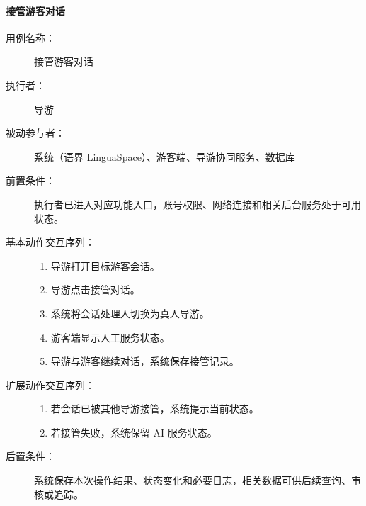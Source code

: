 \paragraph{接管游客对话}
\begin{description}
  \item[用例名称：] 接管游客对话
  \item[执行者：] 导游
  \item[被动参与者：] 系统（语界 LinguaSpace）、游客端、导游协同服务、数据库
  \item[前置条件：] 执行者已进入对应功能入口，账号权限、网络连接和相关后台服务处于可用状态。
  \item[基本动作交互序列：]
  \begin{enumerate}
    \item 导游打开目标游客会话。
    \item 导游点击接管对话。
    \item 系统将会话处理人切换为真人导游。
    \item 游客端显示人工服务状态。
    \item 导游与游客继续对话，系统保存接管记录。
  \end{enumerate}
  \item[扩展动作交互序列：]
  \begin{enumerate}
    \item[2a.] 若会话已被其他导游接管，系统提示当前状态。
    \item[3a.] 若接管失败，系统保留 AI 服务状态。
  \end{enumerate}
  \item[后置条件：] 系统保存本次操作结果、状态变化和必要日志，相关数据可供后续查询、审核或追踪。
\end{description}

